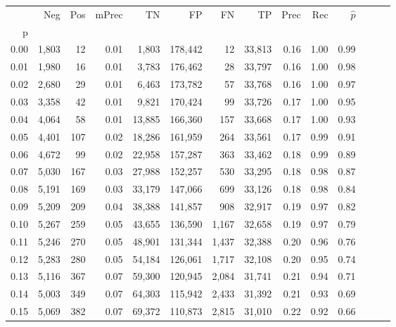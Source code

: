 \begin{tabular}{rrrrrrrrrrrrrr}
\toprule
{} &    Neg &  Pos & mPrec &       TN &       FP &      FN &      TP &  Prec &   Rec & $\hat{p}$ \\
p    &        &      &       &          &          &         &         &       &       &           \\
\midrule
0.00 &  1,803 &   12 &  0.01 &    1,803 &  178,442 &      12 &  33,813 &  0.16 &  1.00 &      0.99 \\
0.01 &  1,980 &   16 &  0.01 &    3,783 &  176,462 &      28 &  33,797 &  0.16 &  1.00 &      0.98 \\
0.02 &  2,680 &   29 &  0.01 &    6,463 &  173,782 &      57 &  33,768 &  0.16 &  1.00 &      0.97 \\
0.03 &  3,358 &   42 &  0.01 &    9,821 &  170,424 &      99 &  33,726 &  0.17 &  1.00 &      0.95 \\
0.04 &  4,064 &   58 &  0.01 &   13,885 &  166,360 &     157 &  33,668 &  0.17 &  1.00 &      0.93 \\
0.05 &  4,401 &  107 &  0.02 &   18,286 &  161,959 &     264 &  33,561 &  0.17 &  0.99 &      0.91 \\
0.06 &  4,672 &   99 &  0.02 &   22,958 &  157,287 &     363 &  33,462 &  0.18 &  0.99 &      0.89 \\
0.07 &  5,030 &  167 &  0.03 &   27,988 &  152,257 &     530 &  33,295 &  0.18 &  0.98 &      0.87 \\
0.08 &  5,191 &  169 &  0.03 &   33,179 &  147,066 &     699 &  33,126 &  0.18 &  0.98 &      0.84 \\
0.09 &  5,209 &  209 &  0.04 &   38,388 &  141,857 &     908 &  32,917 &  0.19 &  0.97 &      0.82 \\
0.10 &  5,267 &  259 &  0.05 &   43,655 &  136,590 &   1,167 &  32,658 &  0.19 &  0.97 &      0.79 \\
0.11 &  5,246 &  270 &  0.05 &   48,901 &  131,344 &   1,437 &  32,388 &  0.20 &  0.96 &      0.76 \\
0.12 &  5,283 &  280 &  0.05 &   54,184 &  126,061 &   1,717 &  32,108 &  0.20 &  0.95 &      0.74 \\
0.13 &  5,116 &  367 &  0.07 &   59,300 &  120,945 &   2,084 &  31,741 &  0.21 &  0.94 &      0.71 \\
0.14 &  5,003 &  349 &  0.07 &   64,303 &  115,942 &   2,433 &  31,392 &  0.21 &  0.93 &      0.69 \\
0.15 &  5,069 &  382 &  0.07 &   69,372 &  110,873 &   2,815 &  31,010 &  0.22 &  0.92 &      0.66 \\

\end{tabular}
